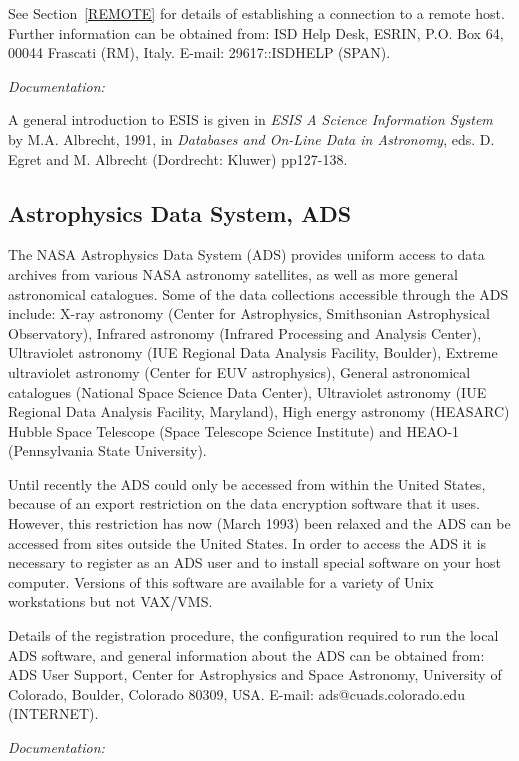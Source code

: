 \documentclass[twoside,11pt,nolof]{starlink}
\begin{document}
See Section~\ref{REMOTE} for details of establishing a connection to
a remote host. Further information can be obtained from: ISD Help Desk,
ESRIN, P.O. Box 64, 00044 Frascati (RM), Italy. E-mail: 29617::ISDHELP
(SPAN).

\textit{Documentation:}

A general introduction to ESIS is given in \textit{ESIS A Science
Information System} by M.A. Albrecht, 1991, in \textit{Databases and
On-Line Data in Astronomy}, eds. D. Egret and M. Albrecht (Dordrecht:
Kluwer) pp127-138.

\subsection{Astrophysics Data System, ADS
}

The NASA Astrophysics Data System (ADS) provides uniform access to data
archives from various NASA astronomy satellites, as well as more general
astronomical catalogues. Some of the data collections accessible through
the ADS include: X-ray astronomy (Center for Astrophysics, Smithsonian
Astrophysical Observatory), Infrared astronomy (Infrared Processing and
Analysis Center), Ultraviolet astronomy (IUE Regional Data Analysis
Facility, Boulder), Extreme ultraviolet astronomy (Center for EUV
astrophysics), General astronomical catalogues (National Space Science
Data Center), Ultraviolet astronomy (IUE Regional Data Analysis
Facility, Maryland), High energy astronomy (HEASARC) Hubble Space
Telescope (Space Telescope Science Institute) and HEAO-1 (Pennsylvania
State University).

Until recently the ADS could only be accessed from within the United
States, because of an export restriction on the data encryption software
that it uses. However, this restriction has now (March 1993) been
relaxed and the ADS can be accessed from sites outside the United
States. In order to access the ADS it is necessary to register as an ADS
user and to install special software on your host computer. Versions of
this software are available for a variety of Unix workstations but not
VAX/VMS.

Details of the registration procedure, the configuration required to
run the local ADS software, and general information about the ADS can be
obtained from: ADS User Support, Center for Astrophysics and Space
Astronomy, University of Colorado, Boulder, Colorado 80309, USA. E-mail:
ads@cuads.colorado.edu (INTERNET).

\textit{Documentation:}
\end{document}
